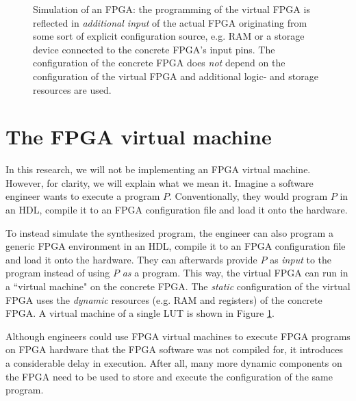 \begin{figure}
    \caption{Simulation of an FPGA: the programming of the virtual FPGA is reflected in \textit{additional input} of the actual FPGA originating from some sort of explicit configuration source, e.g. RAM or a storage device connected to the concrete FPGA's input pins. The configuration of the concrete FPGA does \textit{not} depend on the configuration of the virtual FPGA and additional logic- and storage resources are used.}
    \label{fig:simulation}
\end{figure}

\section{The FPGA virtual machine}
\label{sec:simulation}
In this research, we will not be implementing an FPGA virtual machine. However, for clarity, we will explain what we mean it. Imagine a software engineer wants to execute a program $P$. Conventionally, they would program $P$ in an HDL, compile it to an FPGA configuration file and load it onto the hardware.

To instead simulate the synthesized program, the engineer can also program a generic FPGA environment in an HDL, compile it to an FPGA configuration file and load it onto the hardware. They can afterwards provide $P$ as \textit{input} to the program instead of using $P$ \textit{as} a program. This way, the virtual FPGA can run in a ``virtual machine" on the concrete FPGA. The \textit{static} configuration of the virtual FPGA uses the \textit{dynamic} resources (e.g. RAM and registers) of the concrete FPGA. A virtual machine of a single LUT is shown in Figure \ref{fig:simulation}.

Although engineers could use FPGA virtual machines to execute FPGA programs on FPGA hardware that the FPGA software was not compiled for, it introduces a considerable delay in execution. After all, many more dynamic components on the FPGA need to be used to store and execute the configuration of the same program.	



